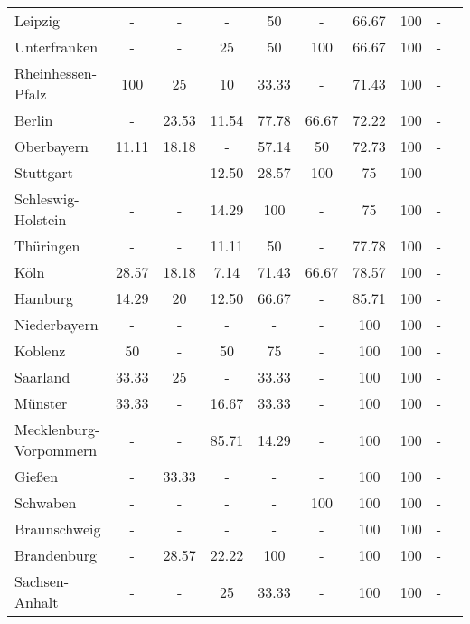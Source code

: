 \begin{table}[H]
\begin{tabularx}{\textwidth}{Xccccccccc}
            Leipzig & - & - & - & 50 & - & 66.67 & 100 & - \\
            Unterfranken & - & - & 25 & 50 & 100 & 66.67 & 100 & - \\
            Rheinhessen-Pfalz & 100 & 25 & 10 & 33.33 & - & 71.43 & 100 & - \\
            Berlin & - & 23.53 & 11.54 & 77.78 & 66.67 & 72.22 & 100 & - \\
            Oberbayern & 11.11 & 18.18 & - & 57.14 & 50 & 72.73 & 100 & - \\
            Stuttgart & - & - & 12.50 & 28.57 & 100 & 75 & 100 & - \\
            Schleswig-Holstein & - & - & 14.29 & 100 & - & 75 & 100 & - \\
            Thüringen & - & - & 11.11 & 50 & - & 77.78 & 100 & - \\
            Köln & 28.57 & 18.18 & 7.14 & 71.43 & 66.67 & 78.57 & 100 & - \\
            Hamburg & 14.29 & 20 & 12.50 & 66.67 & - & 85.71 & 100 & - \\
            Niederbayern & - & - & - & - & - & 100 & 100 & - \\
            Koblenz & 50 & - & 50 & 75 & - & 100 & 100 & - \\
            Saarland & 33.33 & 25 & - & 33.33 & - & 100 & 100 & - \\
            Münster & 33.33 & - & 16.67 & 33.33 & - & 100 & 100 & - \\
            Mecklenburg-Vorpommern & - & - & 85.71 & 14.29 & - & 100 & 100 & - \\
            Gießen & - & 33.33 & - & - & - & 100 & 100 & - \\
            Schwaben & - & - & - & - & 100 & 100 & 100 & - \\
            Braunschweig & - & - & - & - & - & 100 & 100 & - \\
            Brandenburg & - & 28.57 & 22.22 & 100 & - & 100 & 100 & - \\
            Sachsen-Anhalt & - & - & 25 & 33.33 & - & 100 & 100 & - \\
        \bottomrule
    \end{tabularx}
\end{table}
    